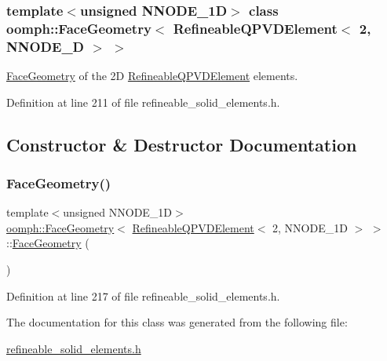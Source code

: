 \subsubsection*{template$<$unsigned N\+N\+O\+D\+E\+\_\+1D$>$\newline
class oomph\+::\+Face\+Geometry$<$ Refineable\+Q\+P\+V\+D\+Element$<$ 2, N\+N\+O\+D\+E\+\_\+D $>$ $>$}

\hyperlink{classoomph_1_1FaceGeometry}{Face\+Geometry} of the 2D \hyperlink{classoomph_1_1RefineableQPVDElement}{Refineable\+Q\+P\+V\+D\+Element} elements. 

Definition at line 211 of file refineable\+\_\+solid\+\_\+elements.\+h.



\subsection{Constructor \& Destructor Documentation}
\mbox{\label{classoomph_1_1FaceGeometry_3_01RefineableQPVDElement_3_012_00_01NNODE__1D_01_4_01_4_ac098cc062fe16fcea10168323c364f49}} 
\subsubsection{\texorpdfstring{Face\+Geometry()}{FaceGeometry()}}
{\footnotesize\ttfamily template$<$unsigned N\+N\+O\+D\+E\+\_\+1D$>$ \\
\hyperlink{classoomph_1_1FaceGeometry}{oomph\+::\+Face\+Geometry}$<$ \hyperlink{classoomph_1_1RefineableQPVDElement}{Refineable\+Q\+P\+V\+D\+Element}$<$ 2, N\+N\+O\+D\+E\+\_\+1D $>$ $>$\+::\hyperlink{classoomph_1_1FaceGeometry}{Face\+Geometry} (\begin{DoxyParamCaption}{ }\end{DoxyParamCaption})\hspace{0.3cm}{\ttfamily [inline]}}



Definition at line 217 of file refineable\+\_\+solid\+\_\+elements.\+h.



The documentation for this class was generated from the following file\+:\begin{DoxyCompactItemize}
\item 
\hyperlink{refineable__solid__elements_8h}{refineable\+\_\+solid\+\_\+elements.\+h}\end{DoxyCompactItemize}

